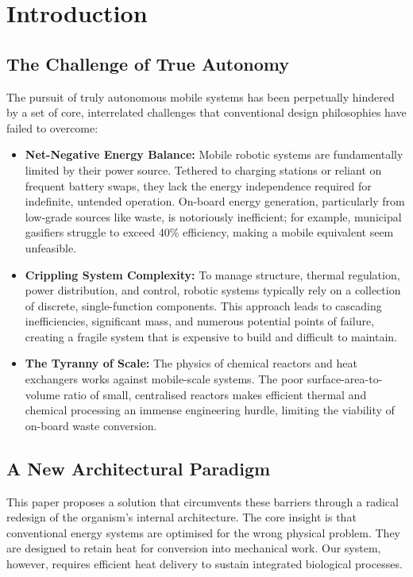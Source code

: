 \section{Introduction}

\subsection{The Challenge of True Autonomy}

The pursuit of truly autonomous mobile systems has been perpetually hindered by a set of core, interrelated challenges that conventional design philosophies have failed to overcome:

\begin{itemize}
    \item \textbf{Net-Negative Energy Balance:} Mobile robotic systems are fundamentally limited by their power source. Tethered to charging stations or reliant on frequent battery swaps, they lack the energy independence required for indefinite, untended operation. On-board energy generation, particularly from low-grade sources like waste, is notoriously inefficient; for example, municipal gasifiers struggle to exceed 40\% efficiency, making a mobile equivalent seem unfeasible.
    
    \item \textbf{Crippling System Complexity:} To manage structure, thermal regulation, power distribution, and control, robotic systems typically rely on a collection of discrete, single-function components. This approach leads to cascading inefficiencies, significant mass, and numerous potential points of failure, creating a fragile system that is expensive to build and difficult to maintain.
    
    \item \textbf{The Tyranny of Scale:} The physics of chemical reactors and heat exchangers works against mobile-scale systems. The poor surface-area-to-volume ratio of small, centralised reactors makes efficient thermal and chemical processing an immense engineering hurdle, limiting the viability of on-board waste conversion.
\end{itemize}

\subsection{A New Architectural Paradigm}

This paper proposes a solution that circumvents these barriers through a radical redesign of the organism's internal architecture. The core insight is that conventional energy systems are optimised for the wrong physical problem. They are designed to retain heat for conversion into mechanical work. Our system, however, requires efficient heat delivery to sustain integrated biological processes.

